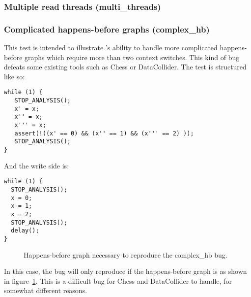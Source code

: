 \subsubsection{Multiple read threads (multi\_threads)}


\subsubsection{Complicated happens-before graphs (complex\_hb)}

This test is intended to illustrate {\technique}'s ability to handle
more complicated happens-before graphs which require more than two
context switches.  This kind of bug defeats some existing tools such
as Chess\needCite{} or DataCollider\needCite{}.  The test is
structured like so:

\begin{verbatim}
while (1) {
   STOP_ANALYSIS();
   x' = x;
   x'' = x;
   x''' = x;
   assert(!((x' == 0) && (x'' == 1) && (x''' == 2) ));
   STOP_ANALYSIS();
}
\end{verbatim}

And the write side is:

\begin{verbatim}
while (1) {
  STOP_ANALYSIS();
  x = 0;
  x = 1;
  x = 2;
  STOP_ANALYSIS();
  delay();
}
\end{verbatim}

\begin{figure}
  \caption{Happens-before graph necessary to reproduce the complex\_hb
    bug.}
  \label{fig:eval:complex_hb}
\end{figure}

In this case, the bug will only reproduce if the happens-before graph
is as shown in figure~\ref{fig:eval:complex_hb}.  This is a difficult
bug for Chess and DataCollider to handle, for somewhat different
reasons.

